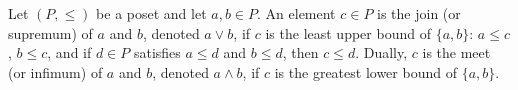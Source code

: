 Let $(P, \leq)$ be a poset and let $a, b \in P$. An element $c \in P$ is the join (or supremum) of $a$ and $b$, denoted $a \vee b$, if $c$ is the least upper bound of $\{a, b\}$: $a \leq c$, $b \leq c$, and if $d \in P$ satisfies $a \leq d$ and $b \leq d$, then $c \leq d$. Dually, $c$ is the meet (or infimum) of $a$ and $b$, denoted $a \wedge b$, if $c$ is the greatest lower bound of $\{a, b\}$.
